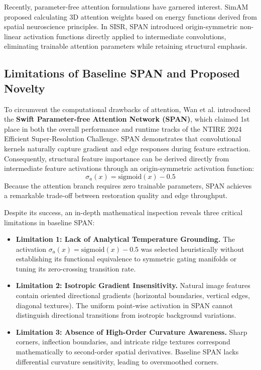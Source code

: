 \documentclass[conference]{IEEEtran}
\begin{document}
Recently, parameter-free attention formulations have garnered interest. SimAM \cite{yang2021simam} proposed calculating 3D attention weights based on energy functions derived from spatial neuroscience principles. In SISR, SPAN \cite{wan2024swift} introduced origin-symmetric non-linear activation functions directly applied to intermediate convolutions, eliminating trainable attention parameters while retaining structural emphasis.

\subsection{Limitations of Baseline SPAN and Proposed Novelty}
To circumvent the computational drawbacks of attention, Wan et al. \cite{wan2024swift} introduced the \textbf{Swift Parameter-free Attention Network (SPAN)}, which claimed 1st place in both the overall performance and runtime tracks of the NTIRE 2024 Efficient Super-Resolution Challenge. SPAN demonstrates that convolutional kernels naturally capture gradient and edge responses during feature extraction. Consequently, structural feature importance can be derived directly from intermediate feature activations through an origin-symmetric activation function:
\begin{equation}
\sigma_a(x) = \text{sigmoid}(x) - 0.5
\end{equation}
Because the attention branch requires zero trainable parameters, SPAN achieves a remarkable trade-off between restoration quality and edge throughput.

Despite its success, an in-depth mathematical inspection reveals three critical limitations in baseline SPAN:
\begin{itemize}
    \item \textbf{Limitation 1: Lack of Analytical Temperature Grounding.} The activation $\sigma_a(x) = \text{sigmoid}(x) - 0.5$ was selected heuristically without establishing its functional equivalence to symmetric gating manifolds or tuning its zero-crossing transition rate.
    \item \textbf{Limitation 2: Isotropic Gradient Insensitivity.} Natural image features contain oriented directional gradients (horizontal boundaries, vertical edges, diagonal textures). The uniform point-wise activation in SPAN cannot distinguish directional transitions from isotropic background variations.
    \item \textbf{Limitation 3: Absence of High-Order Curvature Awareness.} Sharp corners, inflection boundaries, and intricate ridge textures correspond mathematically to second-order spatial derivatives. Baseline SPAN lacks differential curvature sensitivity, leading to oversmoothed corners.
\end{itemize}
\end{document}
